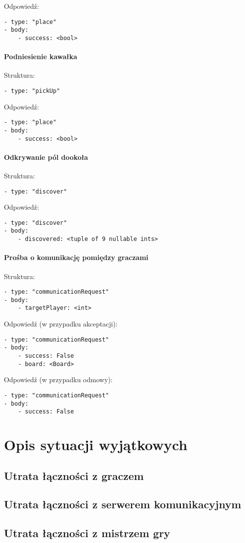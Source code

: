 \documentclass[a4paper]{article}
\begin{document}
Odpowiedź:

\begin{verbatim}
- type: "place"
- body:
    - success: <bool>
\end{verbatim}

\paragraph{Podniesienie kawałka}
\hfill

Struktura:

\begin{verbatim}
- type: "pickUp"
\end{verbatim}

Odpowiedź:

\begin{verbatim}
- type: "place"
- body:
    - success: <bool>
\end{verbatim}

\paragraph{Odkrywanie pól dookoła}
\hfill

Struktura:

\begin{verbatim}
- type: "discover"
\end{verbatim}

Odpowiedź:

\begin{verbatim}
- type: "discover"
- body:
    - discovered: <tuple of 9 nullable ints>
\end{verbatim}

\paragraph{Prośba o komunikację pomiędzy graczami}
\hfill

Struktura:

\begin{verbatim}
- type: "communicationRequest"
- body:
    - targetPlayer: <int>
\end{verbatim}

Odpowiedź (w przypadku akceptacji):

\begin{verbatim}
- type: "communicationRequest"
- body:
    - success: False
    - board: <Board>
\end{verbatim}

Odpowiedź (w przypadku odmowy):

\begin{verbatim}
- type: "communicationRequest"
- body:
    - success: False
\end{verbatim}

\section{Opis sytuacji wyjątkowych}

\subsection{Utrata łączności z graczem}
\subsection{Utrata łączności z serwerem komunikacyjnym}
\subsection{Utrata łączności z mistrzem gry}
\end{document}

